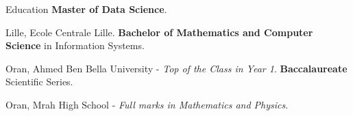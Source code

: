 \begin{rubric}{Education}
  \entry*[2024 -- 2026]%
  \textbf{Master of Data Science}.
  \par Lille, Ecole Centrale Lille.
  \entry*[2021 -- 2024]%
  \textbf{Bachelor of Mathematics and Computer Science} in Information Systems.\par
  Oran, Ahmed Ben Bella University - \emph{Top of the Class in Year 1}.
  \entry*[2020 -- 2021]%
  \textbf{Baccalaureate} Scientific Series.\par
  Oran, Mrah High School - \emph{Full marks in Mathematics and Physics}.
\end{rubric}